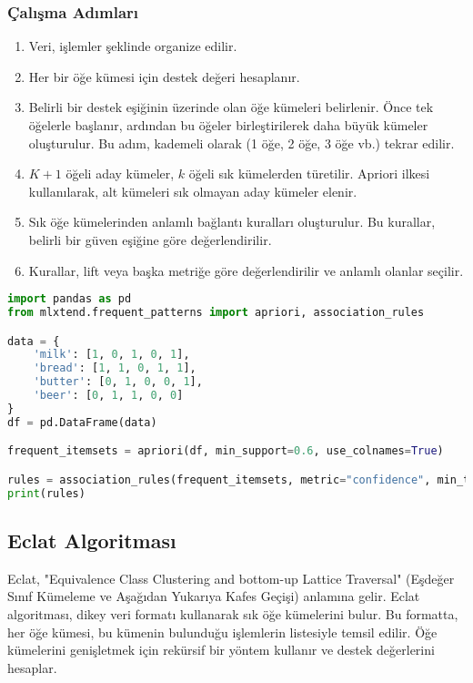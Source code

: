 \subsubsection{Çalışma Adımları}

\begin{enumerate}
	\item Veri, işlemler şeklinde organize edilir.
	\item Her bir öğe kümesi için destek değeri hesaplanır.
	\item Belirli bir destek eşiğinin üzerinde olan öğe kümeleri belirlenir. Önce tek öğelerle başlanır, ardından bu öğeler birleştirilerek daha büyük kümeler oluşturulur. Bu adım, kademeli olarak (1 öğe, 2 öğe, 3 öğe vb.) tekrar edilir.
	\item $K+1$ öğeli aday kümeler, $k$ öğeli sık kümelerden türetilir. Apriori ilkesi kullanılarak, alt kümeleri sık olmayan aday kümeler elenir.
	\item Sık öğe kümelerinden anlamlı bağlantı kuralları oluşturulur. Bu kurallar, belirli bir güven eşiğine göre değerlendirilir.
	\item Kurallar, lift veya başka metriğe göre değerlendirilir ve anlamlı olanlar seçilir.
\end{enumerate}

\begin{lstlisting}[language=Python]
import pandas as pd
from mlxtend.frequent_patterns import apriori, association_rules

data = {
    'milk': [1, 0, 1, 0, 1],
    'bread': [1, 1, 0, 1, 1],
    'butter': [0, 1, 0, 0, 1],
    'beer': [0, 1, 1, 0, 0]
}
df = pd.DataFrame(data)

frequent_itemsets = apriori(df, min_support=0.6, use_colnames=True)

rules = association_rules(frequent_itemsets, metric="confidence", min_threshold=0.7)
print(rules)
\end{lstlisting}

\subsection{Eclat Algoritması}
Eclat, "Equivalence Class Clustering and bottom-up Lattice Traversal" (Eşdeğer Sınıf Kümeleme ve Aşağıdan Yukarıya Kafes Geçişi) anlamına gelir. Eclat algoritması, dikey veri formatı kullanarak sık öğe kümelerini bulur. Bu formatta, her öğe kümesi, bu kümenin bulunduğu işlemlerin listesiyle temsil edilir. Öğe kümelerini genişletmek için rekürsif bir yöntem kullanır ve destek değerlerini hesaplar.



